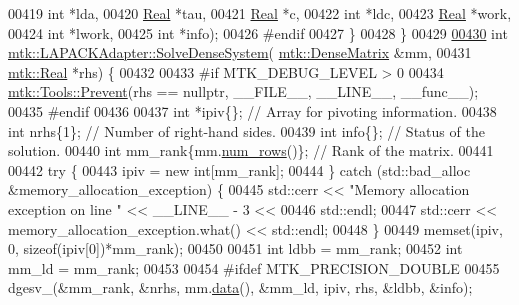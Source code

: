 \begin{DoxyCode}
00419              \textcolor{keywordtype}{int} *lda,
00420              \hyperlink{group__c01-roots_gac080bbbf5cbb5502c9f00405f894857d}{Real} *tau,
00421              \hyperlink{group__c01-roots_gac080bbbf5cbb5502c9f00405f894857d}{Real} *c,
00422              \textcolor{keywordtype}{int} *ldc,
00423              \hyperlink{group__c01-roots_gac080bbbf5cbb5502c9f00405f894857d}{Real} *work,
00424              \textcolor{keywordtype}{int} *lwork,
00425              \textcolor{keywordtype}{int} *info);
00426 \textcolor{preprocessor}{#endif}
00427 \}
00428 \}
00429 
\hypertarget{mtk__lapack__adapter_8cc_source_l00430}{}\hyperlink{classmtk_1_1LAPACKAdapter_a7428bccf74fd4a4af68fb7233846da22}{00430} \textcolor{keywordtype}{int} \hyperlink{classmtk_1_1LAPACKAdapter_a7428bccf74fd4a4af68fb7233846da22}{mtk::LAPACKAdapter::SolveDenseSystem}(
      \hyperlink{classmtk_1_1DenseMatrix}{mtk::DenseMatrix} &mm,
00431                                          \hyperlink{group__c01-roots_gac080bbbf5cbb5502c9f00405f894857d}{mtk::Real} *rhs) \{
00432 
00433 \textcolor{preprocessor}{  #if MTK\_DEBUG\_LEVEL > 0}
00434   \hyperlink{classmtk_1_1Tools_afe5bb096309258e2e72503fd7b41c7e0}{mtk::Tools::Prevent}(rhs == \textcolor{keyword}{nullptr}, \_\_FILE\_\_, \_\_LINE\_\_, \_\_func\_\_);
00435 \textcolor{preprocessor}{  #endif}
00436 
00437   \textcolor{keywordtype}{int} *ipiv\{\};                \textcolor{comment}{// Array for pivoting information.}
00438   \textcolor{keywordtype}{int} nrhs\{1\};                \textcolor{comment}{// Number of right-hand sides.}
00439   \textcolor{keywordtype}{int} info\{\};                 \textcolor{comment}{// Status of the solution.}
00440   \textcolor{keywordtype}{int} mm\_rank\{mm.\hyperlink{classmtk_1_1DenseMatrix_a17d8d3b9cc0926044b6972dd190a5c21}{num\_rows}()\}; \textcolor{comment}{// Rank of the matrix.}
00441 
00442   \textcolor{keywordflow}{try} \{
00443     ipiv = \textcolor{keyword}{new} \textcolor{keywordtype}{int}[mm\_rank];
00444   \} \textcolor{keywordflow}{catch} (std::bad\_alloc &memory\_allocation\_exception) \{
00445     std::cerr << \textcolor{stringliteral}{"Memory allocation exception on line "} << \_\_LINE\_\_ - 3 <<
00446       std::endl;
00447     std::cerr << memory\_allocation\_exception.what() << std::endl;
00448   \}
00449   memset(ipiv, 0, \textcolor{keyword}{sizeof}(ipiv[0])*mm\_rank);
00450 
00451   \textcolor{keywordtype}{int} ldbb = mm\_rank;
00452   \textcolor{keywordtype}{int} mm\_ld = mm\_rank;
00453 
00454 \textcolor{preprocessor}{  #ifdef MTK\_PRECISION\_DOUBLE}
00455   dgesv\_(&mm\_rank, &nrhs, mm.\hyperlink{classmtk_1_1DenseMatrix_a16b3ff56feb2658b9fc7147d1de4d8e7}{data}(), &mm\_ld, ipiv, rhs, &ldbb, &info);

\end{DoxyCode}
